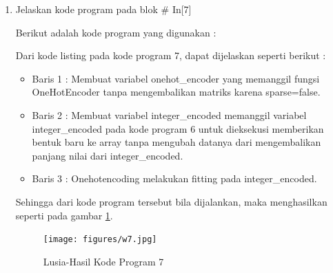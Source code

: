 \begin{enumerate}
\item Jelaskan kode program pada blok \# In[7]
	\par Berikut adalah kode program yang digunakan :
	
	\par Dari kode listing pada kode program 7, dapat dijelaskan seperti berikut :
	\begin{itemize}
	\item Baris 1	: Membuat variabel onehot\_encoder yang memanggil fungsi OneHotEncoder tanpa mengembalikan matriks karena sparse=false.
	\item Baris 2	: Membuat variabel integer\_encoded memanggil variabel integer\_encoded pada kode program 6 untuk dieksekusi memberikan bentuk baru ke array tanpa mengubah datanya dari mengembalikan panjang nilai dari integer\_encoded.
	\item Baris 3	: Onehotencoding melakukan fitting pada integer\_encoded.
	\end{itemize}
	\par Sehingga dari kode program tersebut bila dijalankan, maka menghasilkan seperti pada gambar \ref{7B7}.
		\begin{figure}[!hbtp]
		\centering
		\texttt{[image: figures/w7.jpg]}
		\caption{Lusia-Hasil Kode Program 7}
		\label{7B7}
		\end{figure}


\end{enumerate}

